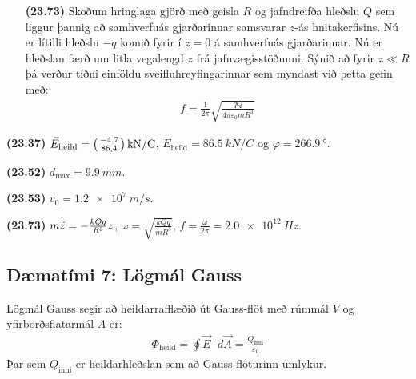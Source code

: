 \begin{enumerate}[label = \textbf{(\alph*)}]
\item[\textbf{(23.73)}] Skoðum hringlaga gjörð með geisla $R$ og jafndreifða hleðslu $Q$ sem liggur þannig að samhverfuás gjarðarinnar samsvarar $z$-ás hnitakerfisins. Nú er lítilli hleðslu $-q$ komið fyrir í $z = 0$ á samhverfuás gjarðarinnar. Nú er hleðslan færð um litla vegalengd $z$ frá jafnvægisstöðunni. Sýnið að fyrir $z \ll R$ þá verður tíðni einföldu sveifluhreyfingarinnar sem myndast við þetta gefin með:
\begin{align*}
    f = \frac{1}{2\pi} \sqrt{\frac{qQ}{4\pi \varepsilon_0 m R^3}}
\end{align*}

\end{enumerate}

\begin{tcolorbox}
\begin{enumerate*}[label = \vspace{0.15cm} ]
  \item \textbf{(23.37)} $\vec{E}_{\text{heild}} = \smqty(-4,7 \\ 86,4) \, \si{kN/C}$, $E_{\text{heild}} = \SI{86.5}{kN/C}$ og $\varphi = \SI{266.9}{\degree}$.
  \item \textbf{(23.52)} $d_{\text{max}} = \SI{9.9}{mm}$.
  \item \textbf{(23.53)} $v_0 = \SI{1.2e7}{m/s}$.
  \item \textbf{(23.73)} $m\Ddot{z} = - \frac{kQq}{R^3}z$, $\omega = \sqrt{\frac{kQq}{mR^3}}$, $f = \frac{\omega}{2\pi} = \SI{2.0e12}{Hz}$.
\end{enumerate*}
\end{tcolorbox}

\newpage

\subsection*{Dæmatími 7: Lögmál Gauss}


\begin{tcolorbox}
Lögmál Gauss segir að heildarrafflæðið út Gauss-flöt með rúmmál $V$ og yfirborðsflatarmál $A$ er:
\begin{align*}
    \Phi_{\text{heild}} = \oint \vec{E} \cdot d\vec{A} = \frac{Q_{\text{inni}}}{\varepsilon_0}
\end{align*}
Þar sem $Q_{\text{inni}}$ er heildarhleðslan sem að Gauss-flöturinn umlykur.
\end{tcolorbox}



